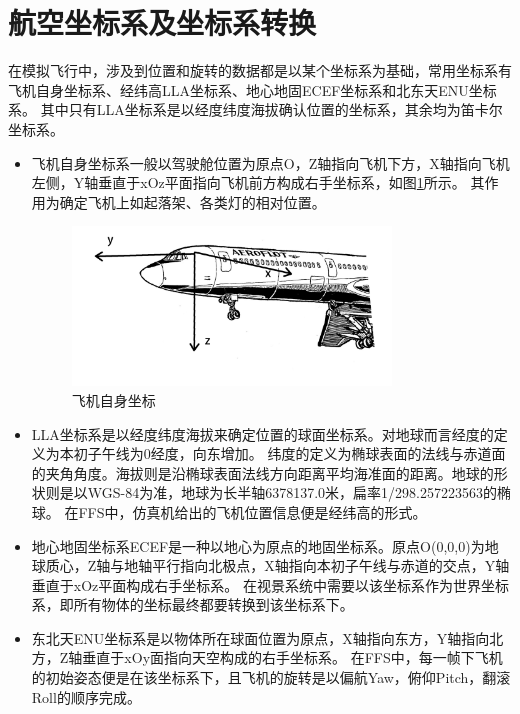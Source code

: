 \section{航空坐标系及坐标系转换}
在模拟飞行中，涉及到位置和旋转的数据都是以某个坐标系为基础，常用坐标系有飞机自身坐标系、经纬高LLA坐标系、地心地固ECEF坐标系和北东天ENU坐标系。
其中只有LLA坐标系是以经度纬度海拔确认位置的坐标系，其余均为笛卡尔坐标系。
\begin{itemize}
    \item [（1）]
    飞机自身坐标系一般以驾驶舱位置为原点O，Z轴指向飞机下方，X轴指向飞机左侧，Y轴垂直于xOz平面指向飞机前方构成右手坐标系，如图\ref{crood1}所示。
    其作用为确定飞机上如起落架、各类灯的相对位置\cite{crood4}。
    \begin{figure}[h!]
        \begin{center}
            \includegraphics[width=0.8\textwidth]{pictures/plane.png}
            \caption{飞机自身坐标}
            \label{crood1}
        \end{center}
    \end{figure}
    \item [（2）]
    LLA坐标系是以经度纬度海拔来确定位置的球面坐标系。对地球而言经度的定义为本初子午线为0经度，向东增加。
    纬度的定义为椭球表面的法线与赤道面的夹角角度。海拔则是沿椭球表面法线方向距离平均海准面的距离。地球的形状则是以WGS-84为准，地球为长半轴6378137.0米，扁率1/298.257223563的椭球\cite{crood1}。
    在FFS中，仿真机给出的飞机位置信息便是经纬高的形式。
    \item [（3）]
    地心地固坐标系ECEF是一种以地心为原点的地固坐标系。原点O(0,0,0)为地球质心，Z轴与地轴平行指向北极点，X轴指向本初子午线与赤道的交点，Y轴垂直于xOz平面构成右手坐标系\cite{crood2}。
    在视景系统中需要以该坐标系作为世界坐标系，即所有物体的坐标最终都要转换到该坐标系下。
    \item [（4）]
    东北天ENU坐标系是以物体所在球面位置为原点，X轴指向东方，Y轴指向北方，Z轴垂直于xOy面指向天空构成的右手坐标系\cite{crood3}。
    在FFS中，每一帧下飞机的初始姿态便是在该坐标系下，且飞机的旋转是以偏航Yaw，俯仰Pitch，翻滚Roll的顺序完成。

\end{itemize}
